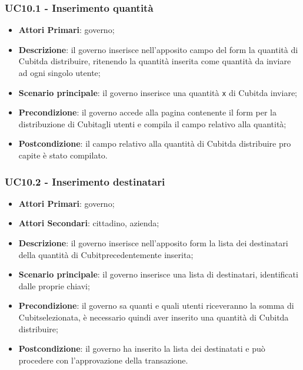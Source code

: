 \subsubsection{UC10.1 - Inserimento quantità}
\begin{itemize}
	\item \textbf{Attori Primari}: governo;
	\item \textbf{Descrizione}: il governo inserisce nell'apposito campo del form la quantità di Cubit\glosp da distribuire, ritenendo la quantità inserita come quantità da inviare ad ogni singolo utente;
	\item \textbf{Scenario principale}: il governo inserisce una quantità \texttt{x} di Cubit\glosp da inviare;
	\item \textbf{Precondizione}: il governo accede alla pagina contenente il form per la distribuzione di Cubit\glosp agli utenti e compila il campo relativo alla quantità;
	\item \textbf{Postcondizione}: il campo relativo alla quantità di Cubit\glosp da distribuire pro capite è stato compilato. 
\end{itemize}
\subsubsection{UC10.2 - Inserimento destinatari}
\begin{itemize}
	\item \textbf{Attori Primari}: governo;
	\item \textbf{Attori Secondari}: cittadino, azienda;
	\item \textbf{Descrizione}: il governo inserisce nell'apposito form la lista dei destinatari della quantità di Cubit\glosp precedentemente inserita;
	\item \textbf{Scenario principale}: il governo inserisce una lista di destinatari, identificati dalle proprie chiavi\glo;
	\item \textbf{Precondizione}: il governo sa quanti e quali utenti riceveranno la somma di Cubit\glosp selezionata, è necessario quindi aver inserito una quantità di Cubit\glosp da distribuire;
	\item \textbf{Postcondizione}: il governo ha inserito la lista dei destinatati e può procedere con l'approvazione della transazione.
\end{itemize}
